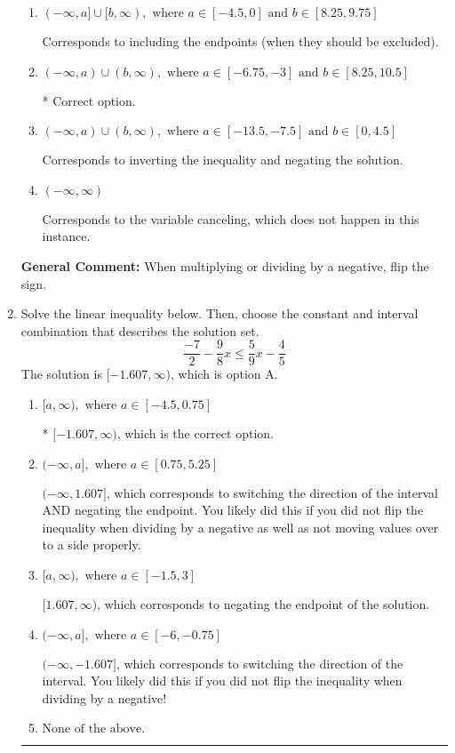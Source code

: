 \documentclass{extbook}[14pt]
\newcommand{\litem}[1]{\item #1

\rule{\textwidth}{0.4pt}}
\begin{document}
\begin{enumerate}
{\begin{enumerate}[label=\Alph*.]
Corresponds to including the endpoints AND negating.
\item \( (-\infty, a] \cup [b, \infty), \text{ where } a \in [-4.5, 0] \text{ and } b \in [8.25, 9.75] \)

Corresponds to including the endpoints (when they should be excluded).
\item \( (-\infty, a) \cup (b, \infty), \text{ where } a \in [-6.75, -3] \text{ and } b \in [8.25, 10.5] \)

 * Correct option.
\item \( (-\infty, a) \cup (b, \infty), \text{ where } a \in [-13.5, -7.5] \text{ and } b \in [0, 4.5] \)

Corresponds to inverting the inequality and negating the solution.
\item \( (-\infty, \infty) \)

Corresponds to the variable canceling, which does not happen in this instance.
\end{enumerate}

\textbf{General Comment:} When multiplying or dividing by a negative, flip the sign.
}
\litem{
Solve the linear inequality below. Then, choose the constant and interval combination that describes the solution set.
\[ \frac{-7}{2} - \frac{9}{8} x \leq \frac{5}{9} x - \frac{4}{5} \]The solution is \( [-1.607, \infty) \), which is option A.\begin{enumerate}[label=\Alph*.]
\item \( [a, \infty), \text{ where } a \in [-4.5, 0.75] \)

* $[-1.607, \infty)$, which is the correct option.
\item \( (-\infty, a], \text{ where } a \in [0.75, 5.25] \)

 $(-\infty, 1.607]$, which corresponds to switching the direction of the interval AND negating the endpoint. You likely did this if you did not flip the inequality when dividing by a negative as well as not moving values over to a side properly.
\item \( [a, \infty), \text{ where } a \in [-1.5, 3] \)

 $[1.607, \infty)$, which corresponds to negating the endpoint of the solution.
\item \( (-\infty, a], \text{ where } a \in [-6, -0.75] \)

 $(-\infty, -1.607]$, which corresponds to switching the direction of the interval. You likely did this if you did not flip the inequality when dividing by a negative!
\item \( \text{None of the above}. \)


\end{enumerate}}
\end{enumerate}
\end{document}
